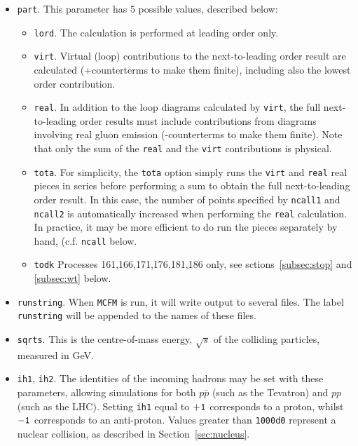 \documentclass[12pt]{article}
\begin{document}
\begin{itemize}
\begin{table}
\end{table}

\item {\tt part}.
This parameter has 5 possible values, described below:
\begin{itemize}
\item {\tt lord}.
The calculation is performed at leading order only.
\item {\tt virt}.
Virtual (loop) contributions to the next-to-leading order result are
calculated (+counterterms to make them finite), including also the
lowest order contribution.
\item {\tt real}.
In addition to the loop diagrams calculated by {\tt virt}, the full
next-to-leading order results must include contributions from diagrams
involving real gluon emission (-counterterms to make them finite).
Note that only the sum of the {\tt real} and the {\tt virt} contributions
is physical.
\item {\tt tota}.
For simplicity, the {\tt tota} option simply runs the {\tt virt} and
{\tt real} real pieces in series before performing a sum to obtain
the full next-to-leading order result. In this case, the number of
points specified by {\tt ncall1} and {\tt ncall2} is automatically
increased when performing the {\tt real} calculation. In practice,
it may be more efficient to do run the pieces separately by hand, 
(c.f. {\tt ncall} below.
\item {\tt todk}
Processes 161,166,171,176,181,186 only, see sctions~\ref{subsec:stop} and
\ref{subsec:wt} below.
\end{itemize}

\item {\tt runstring}.
When {\tt MCFM} is run, it will write output to several files. The
label {\tt runstring} will be appended to the names of these files.

\item {\tt sqrts}. This is the centre-of-mass energy, $\sqrt{s}$ of
the colliding particles, measured in GeV.

\item {\tt ih1}, {\tt ih2}. The identities of the incoming hadrons
may be set with these parameters, allowing simulations for both
$p{\bar p}$ (such as the Tevatron) and $pp$ (such as the LHC). 
Setting {\tt ih1} equal to ${\tt +1}$ corresponds to
a proton, whilst ${\tt -1}$ corresponds to an anti-proton.
Values greater than {\tt 1000d0} represent a nuclear collision,
as described in Section~\ref{sec:nucleus}.


\end{itemize}
\end{document}
